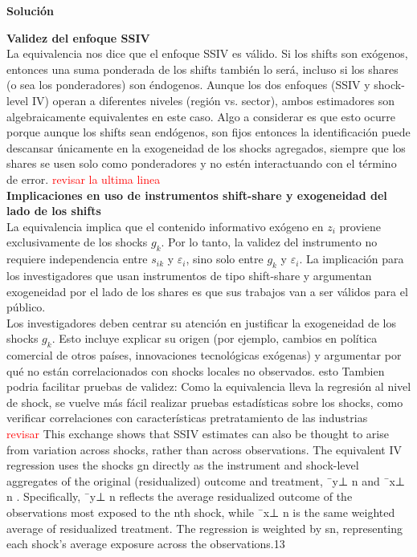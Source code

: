 \documentclass[a4paper, answers, addpoints, 11pt]{exam}
\newenvironment{solucion}{%
  \begin{mdframed}[
    backgroundcolor=blue!5,    %
    linecolor=blue!50,          %
    linewidth=2pt,              %
    leftmargin=10pt,            %
    rightmargin=8pt,           %
    topline=true,              %
    bottomline=true,            %
    roundcorner=10pt,           %
    innerleftmargin=10pt,       %
    innerrightmargin=10pt,      %
    innerbottommargin=10pt,     %
    innertopmargin=10pt         %
  ]%
  \begin{tcolorbox}[colframe=blue!50!black, colback=blue!50, coltitle=white, sharp corners=all, boxrule=1mm, width=\textwidth, halign=left, valign=center, top=0mm, bottom=0mm, left=0mm, right=0mm] \textbf{Solución} \end{tcolorbox} }{\end{mdframed}}
\begin{document}
\begin{enumerate}
\begin{enumerate}[label=\alph*)]
\begin{solucion}
         \textbf{Validez del enfoque SSIV}\\
         La equivalencia nos dice que el enfoque SSIV es válido. Si los shifts son exógenos, entonces una suma ponderada de los shifts también lo será, incluso si los shares (o sea los ponderadores) son éndogenos. Aunque los dos enfoques (SSIV y shock-level IV) operan a diferentes niveles (región vs. sector), ambos estimadores son algebraicamente equivalentes en este caso. Algo a considerar es que esto ocurre porque aunque los shifts sean endógenos, son fijos entonces la identificación puede descansar únicamente en la exogeneidad de los shocks agregados, siempre que los shares se usen solo como ponderadores y no estén interactuando con el término de error. \textcolor{red}{revisar la ultima linea}\\

        \textbf{Implicaciones en uso de instrumentos  shift-share y exogeneidad del lado de los shifts}\\
        La equivalencia implica que el contenido informativo exógeno en $z_i$ proviene exclusivamente de los shocks $g_k$. Por lo tanto, la validez del instrumento no requiere independencia entre $s_{ik}$ y $\varepsilon_i$, sino solo entre $g_k$ y $\varepsilon_i$. La implicación para los investigadores que usan instrumentos de tipo shift-share y argumentan exogeneidad por el lado de los shares es que sus trabajos van a ser válidos para el público. \\
        Los investigadores deben centrar su atención en justificar la exogeneidad de los shocks $g_k$. Esto incluye explicar su origen (por ejemplo, cambios en política comercial de otros países, innovaciones tecnológicas exógenas) y argumentar por qué no están correlacionados con shocks locales no observados. esto Tambien podria facilitar pruebas de validez:
Como la equivalencia lleva la regresión al nivel de shock, se vuelve más fácil realizar pruebas estadísticas sobre los shocks, como verificar correlaciones con características pretratamiento de las industrias\\
\textcolor{red}{revisar}
This exchange shows that SSIV estimates
can also be thought to arise from variation across shocks, rather than across observations. The
equivalent IV regression uses the shocks gn directly as the instrument and shock-level aggregates
of the original (residualized) outcome and treatment, ¯y⊥
n and ¯x⊥
n . Specifically, ¯y⊥
n reflects the
average residualized outcome of the observations most exposed to the nth shock, while ¯x⊥
n is the
same weighted average of residualized treatment. The regression is weighted by sn, representing
each shock’s average exposure across the observations.13

        

    
    \end{solucion}

    
            \end{enumerate}

\end{enumerate}
\end{document}
